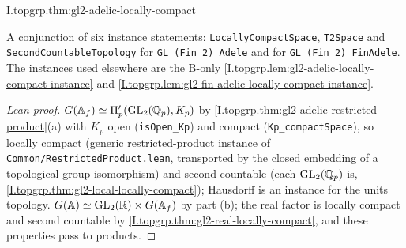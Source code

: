 \begin{theorem}
\end{theorem}
\begin{tfformal}{I.topgrp.thm:gl2-adelic-locally-compact}
\begin{tffidelity}
A conjunction of six instance statements: \texttt{LocallyCompactSpace}, \texttt{T2Space} and \texttt{SecondCountableTopology} for \texttt{GL (Fin 2) Adele} and for \texttt{GL (Fin 2) FinAdele}. The instances used elsewhere are the B-only \cref{I.topgrp.lem:gl2-adelic-locally-compact-instance} and \cref{I.topgrp.lem:gl2-fin-adelic-locally-compact-instance}.
\end{tffidelity}
\end{tfformal}
\begin{proof}[Lean proof]
$G(\mathbb{A}_f)\simeq\Pi'_p(\mathrm{GL}_2(\mathbb{Q}_p),K_p)$ by \cref{I.topgrp.thm:gl2-adelic-restricted-product}(a) with $K_p$ open (\texttt{isOpen\_Kp}) and compact (\texttt{Kp\_compactSpace}), so locally compact (generic restricted-product instance of \texttt{Common/RestrictedProduct.lean}, transported by the closed embedding of a topological group isomorphism) and second countable (each $\mathrm{GL}_2(\mathbb{Q}_p)$ is, \cref{I.topgrp.thm:gl2-local-locally-compact}); Hausdorff is an instance for the units topology. $G(\mathbb{A})\simeq\mathrm{GL}_2(\mathbb{R})\times G(\mathbb{A}_f)$ by part (b); the real factor is locally compact and second countable by \cref{I.topgrp.thm:gl2-real-locally-compact}, and these properties pass to products.
\end{proof}

